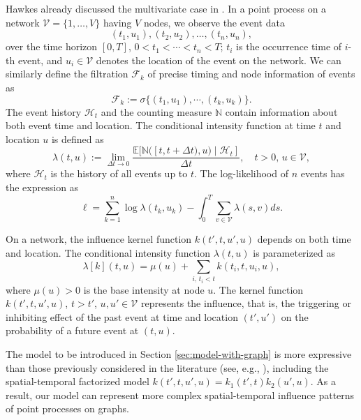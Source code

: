 \documentclass[11pt]{article}
\theoremstyle{remark}
\theoremstyle{plain}
\newcommand{\calH}{\mathcal{H}}
\newcommand{\calF}{\mathcal{F}}
\newcommand{\calV}{\mathcal{V}}
\newcommand{\E}{\mathbb{E}}
\begin{document}
Hawkes already discussed the multivariate case in \cite{hawkes1971spectra}. 
In a point process on a network $\calV = \{1, \ldots, V \}$ having $V$ nodes, we observe the event data
\begin{equation}\label{eq:ti-ui-on-graph}
    (t_1,u_1), (t_2,u_2), \ldots, (t_n,u_n),
\end{equation}
over the time horizon  $[0,T]$,
$0 < t_1 < \cdots < t_n < T$;
 $t_i$ is the occurrence time of $i$-th event, and
  $u_i \in \calV $ denotes the location of the event on the network. 
We can similarly define the filtration $\calF_k$ of precise timing and node information of events as
\begin{equation}
\calF_k :=  \sigma\{ (t_1, u_1) , \cdots, (t_k, u_k) \}.
\label{filtration_1}
\end{equation}
The event history $\calH_t$ and the counting measure $\mathbb{N}$ contain information about both event time and location. 
The conditional intensity function at time $t$ and location $u$ is defined as 
\[
    \lambda (t, u) := \lim _{\Delta t \rightarrow 0} 
     \frac{\E [ \mathbb{N}( [t, t+\Delta t), u)  \mid \calH_t ]}{\Delta t}, \quad t >0, \, u \in \calV,
\]
where $\calH_t $ is the history of all events up to $t$. 
The log-likelihood of $n$ events has the expression as \cite{reinhart2018review}
\[
\ell = \sum_{k=1}^n \log \lambda(t_k, u_k) - \int_0^T  \sum_{v \in \calV } \lambda(s, v) ds.
\]

On a network, the influence kernel function $k(t', t, u', u)$ depends on both time and location. The conditional intensity function  $\lambda( t,u)$ is parameterized  as
\begin{equation}
    \lambda [ k ] (t, u )= \mu(u) + \sum_{i, \, t_i < t } k(t_i,t, u_i, u), \label{eq:classicHawkes}
\end{equation}
where $\mu(u)>0$ is the base intensity at node $u$.
 The kernel function $k (t', t, u', u )$, $t>t'$, $u, u' \in \mathcal V$ represents the influence, that is, the triggering or inhibiting effect of the past event at time and location $(t',u')$ 
 on the probability of a future event at $(t,u)$. 


The model to be introduced in Section \ref{sec:model-with-graph} is more expressive than those previously considered in the literature (see, e.g., \cite{reinhart2018review}), including the spatial-temporal factorized model $k(t', t, u', u) = k_1 (t', t)k_2(u',u)$. As a result, our model can represent more complex spatial-temporal influence patterns of point processes on graphs. 
\end{document}
